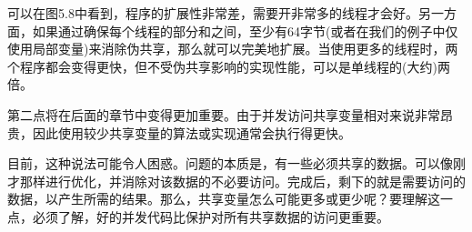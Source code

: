 可以在图5.8中看到，程序的扩展性非常差，需要开非常多的线程才会好。另一方面，如果通过确保每个线程的部分和之间，至少有64字节(或者在我们的例子中仅使用局部变量)来消除伪共享，那么就可以完美地扩展。当使用更多的线程时，两个程序都会变得更快，但不受伪共享影响的实现性能，可以是单线程的(大约)两倍。

第二点将在后面的章节中变得更加重要。由于并发访问共享变量相对来说非常昂贵，因此使用较少共享变量的算法或实现通常会执行得更快。

目前，这种说法可能令人困惑。问题的本质是，有一些必须共享的数据。可以像刚才那样进行优化，并消除对该数据的不必要访问。完成后，剩下的就是需要访问的数据，以产生所需的结果。那么，共享变量怎么可能更多或更少呢？要理解这一点，必须了解，好的并发代码比保护对所有共享数据的访问更重要。






































